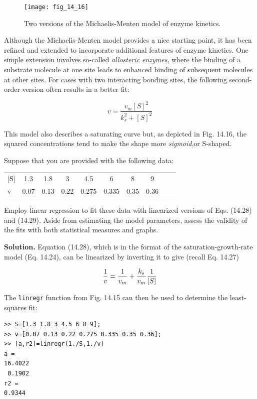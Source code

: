 \documentclass[../main.tex]{subfiles}
\begin{document}
\begin{figure}[H] %
	\centering
	\texttt{[image: fig\_14\_16]}
	\caption{\textsf{Two versions of the Michaelis-Menten model of enzyme kinetics.}}
	\label{fig:fig_14_16}
\end{figure}

Although the Michaelis-Menten model provides a nice starting point, it has been refined and extended to incorporate additional features of enzyme kinetics. One simple extension involves so-called \textit{allosteric enzymes}, where the binding of a substrate molecule at one site leads to enhanced binding of subsequent molecules at other sites. For cases with two interacting bonding sites, the following second-order version often results in a better fit:

\begin{equation}
	\tag{14.29}
	v = \frac{v_m {[S]}^2}{k^2_s + {[S]}^2}
\end{equation}

\noindent This model also describes a saturating curve but, as depicted in Fig. 14.16, the squared concentrations tend to make the shape more \textit{sigmoid},or S-shaped.

Suppose that you are provided with the following data:

\begin{tabular}{l c c c c c c c c c}
	[S] &1.3 & 1.8 & 3  &  4.5  & 6  &   8   & 9 \\
	v  & 0.07 &0.13 &0.22 &0.275& 0.335& 0.35 &0.36
\end{tabular}

\noindent Employ linear regression to fit these data with linearized versions of Eqs. (14.28) and (14.29). Aside from estimating the model parameters, assess the validity of the fits with both statistical measures and graphs.

\textbf{Solution.} Equation (14.28), which is in the format of the saturation-growth-rate model (Eq. 14.24), can be linearized by inverting it to give (recall Eq. 14.27)

\begin{equation}
	\notag
	\frac{1}{v} = \frac{1}{v_m} + \frac{k_s}{v_m} \frac{1}{[S]}
\end{equation}

\noindent The \texttt{linregr} function from Fig. 14.15 can then be used to determine the least-squares fit:

\begin{lstlisting}[numbers=none] 
>> S=[1.3 1.8 3 4.5 6 8 9];
>> v=[0.07 0.13 0.22 0.275 0.335 0.35 0.36];
>> [a,r2]=linregr(1./S,1./v)
a =
16.4022
 0.1902
r2 =
0.9344
\end{lstlisting}
\end{document}
